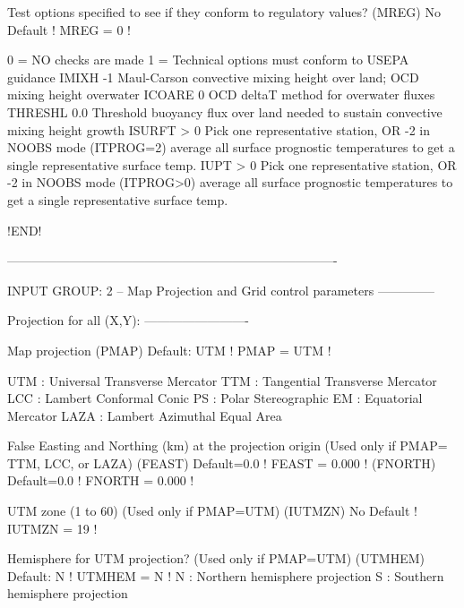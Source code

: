 \documentclass[a4paper,10pt]{article}
\begin{document}
     Test options specified to see if
     they conform to regulatory
     values? (MREG)                   No Default       ! MREG =   0   !

        0 = NO checks are made
        1 = Technical options must conform to USEPA guidance
                  IMIXH    -1       Maul-Carson convective mixing height
                                    over land; OCD mixing height overwater
                  ICOARE   0        OCD deltaT method for overwater fluxes
                  THRESHL  0.0      Threshold buoyancy flux over land needed
                                    to sustain convective mixing height growth
                  ISURFT   > 0      Pick one representative station, OR
                           -2       in NOOBS mode (ITPROG=2) average all
                                    surface prognostic temperatures to get
                                    a single representative surface temp.
                  IUPT     > 0      Pick one representative station, OR
                           -2       in NOOBS mode (ITPROG>0) average all surface
                                    prognostic temperatures to get a single
                                    representative surface temp.

!END!

-------------------------------------------------------------------------------

INPUT GROUP: 2 -- Map Projection and Grid control parameters
--------------

     Projection for all (X,Y):
     -------------------------

     Map projection
     (PMAP)                     Default: UTM    ! PMAP = UTM  !

         UTM :  Universal Transverse Mercator
         TTM :  Tangential Transverse Mercator
         LCC :  Lambert Conformal Conic
          PS :  Polar Stereographic
          EM :  Equatorial Mercator
        LAZA :  Lambert Azimuthal Equal Area

     False Easting and Northing (km) at the projection origin
     (Used only if PMAP= TTM, LCC, or LAZA)
     (FEAST)                    Default=0.0     ! FEAST  = 0.000  !
     (FNORTH)                   Default=0.0     ! FNORTH = 0.000  !

     UTM zone (1 to 60)
     (Used only if PMAP=UTM)
     (IUTMZN)                   No Default      ! IUTMZN =  19   !

     Hemisphere for UTM projection?
     (Used only if PMAP=UTM)
     (UTMHEM)                   Default: N      ! UTMHEM = N  !
         N   :  Northern hemisphere projection
         S   :  Southern hemisphere projection
\end{document}
